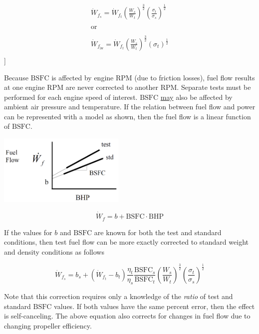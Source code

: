 \documentclass[
]{book}
\begin{document}
\begin{align}
\dot{W}_{f_s} = \dot{W}_{f_t} \left( \frac{W_s}{W_t} \right)^{\frac{3}{2}} \left( \frac{\sigma_t}{\sigma_s} \right)^{\frac{1}{2}} \\
\\
\text{or} \\
\\
\dot{W}_{f_{\text{iw}}} = \dot{W}_{f_t} \left( \frac{W_s}{W_t} \right)^{\frac{3}{2}} \left( \sigma_t \right)^{\frac{1}{2}} \\
\end{align}
\label{eq:fuel-flow-std}
{]}

Because \(\mathrm{BSFC}\) is affected by engine \(\mathrm{RPM}\) (due to
friction losses), fuel flow results at one engine \(\mathrm{RPM}\) are never
corrected to another \(\mathrm{RPM}\). Separate tests must be performed for each
engine speed of interest. \(\mathrm{BSFC}\) \underline{may} also be affected
by ambient air pressure and temperature. If the relation between fuel flow and
power can be represented with a model as shown, then the fuel flow is a linear
function of \(\mathrm{BSFC}\).

\includegraphics[width=2.38542in,height=1.33542in]{media/12/fuel-flow-power-curve.png}

\[
\dot{W}_f = b + \mathrm{BSFC} \cdot \mathrm{BHP}
\]

If the values for \(b\) and \(\mathrm{BSFC}\) are known for both the test and
standard conditions, then test fuel flow can be more exactly corrected to
standard weight and density conditions as follows

\[
\dot{W}_{f_s} = b_s + \left( \dot{W}_{f_t} - b_t \right) \frac{\eta_t}{\eta_s} \frac{\mathrm{BSFC}_s}{\mathrm{BSFC}_t} \left( \frac{W_s}{W_t} \right)^{\frac{3}{2}} \left( \frac{\sigma_t}{\sigma_s} \right)^{\frac{1}{2}}
\label{eq:fuel-flow-std-bsfc}
\]

Note that this correction requires only a knowledge of the \emph{ratio} of test and
standard \(\mathrm{BSFC}\) values. If both values have the same percent error,
then the effect is self-canceling. The above equation also corrects for changes
in fuel flow due to changing propeller efficiency.
\end{document}
